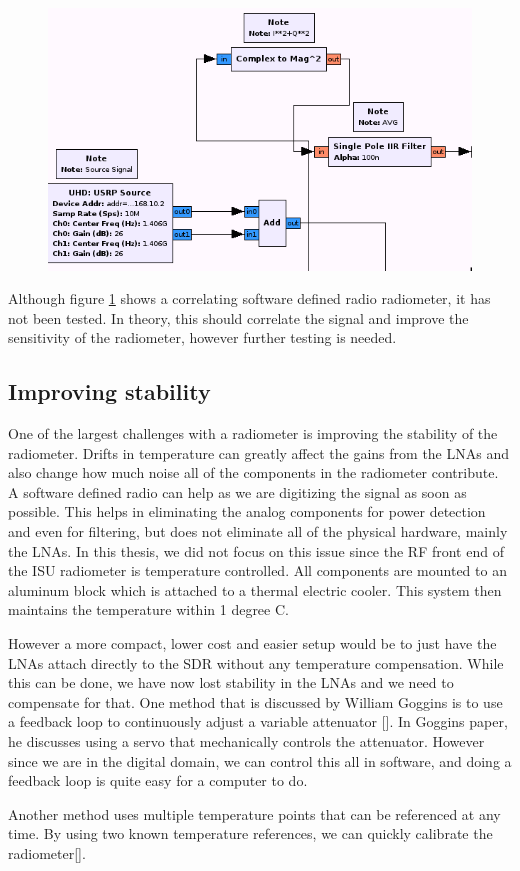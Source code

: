 {\begin{figure}[h!tb] 
\centering
\includegraphics[width=14cm]{Images/N200_rad_corr.png}
\label{correlating_sdr}
\end{figure}
}

Although figure \ref{correlating_sdr} shows a correlating software defined radio radiometer, it has not been tested.  In theory, this should correlate the signal and improve the sensitivity of the radiometer, however further testing is needed.

\subsection{Improving stability}

One of the largest challenges with a radiometer is improving the stability of the radiometer.  Drifts in temperature can greatly affect the gains from the LNAs and also change how much noise all of the components in the radiometer contribute.  A software defined radio can help as we are digitizing the signal as soon as possible.  This helps in eliminating the analog components for power detection and even for filtering, but does not eliminate all of the physical hardware, mainly the LNAs.  In this thesis, we did not focus on this issue since the RF front end of the ISU radiometer is temperature controlled.  All components are mounted to an aluminum block which is attached to a thermal electric cooler.  This system then maintains the temperature within 1 degree C.  

However a more compact, lower cost and easier setup would be to just have the LNAs attach directly to the SDR without any temperature compensation.  While this can be done, we have now lost stability in the LNAs and we need to compensate for that.  One method that is discussed by William Goggins is to use a feedback loop to continuously adjust a variable attenuator [\cite{Goggins}].  In Goggins paper, he discusses using a servo that mechanically controls the attenuator.  However since we are in the digital domain, we can control this all in software, and doing a feedback loop is quite easy for a computer to do.  

Another method uses multiple temperature points that can be referenced at any time.  By using two known temperature references, we can quickly calibrate the radiometer[\cite{Hach}].  